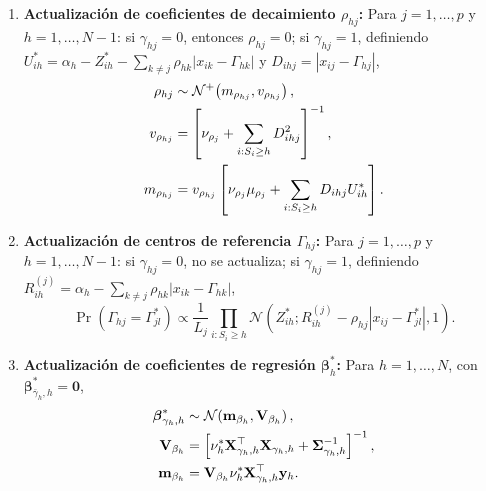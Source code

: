 \begin{enumerate}
    \item \textbf{Actualización de coeficientes de decaimiento $\rho_{hj}$:}
    Para $j = 1, \dots, p$ y $h = 1, \dots, N-1$: si $\gamma_{hj} = 0$,
    entonces $\rho_{hj} = 0$; si $\gamma_{hj} = 1$, definiendo
    $U_{ih}^* = \alpha_h - Z_{ih}^* - \sum_{k \neq j}\rho_{hk}
    |x_{ik} - \Gamma_{hk}|$ y $D_{ihj} = |x_{ij} - \Gamma_{hj}|$,
    \begin{align}
    \rho_{hj} &\sim \mathcal{N}^+\!\left(m_{\rho_{hj}},
    v_{\rho_{hj}}\right), \notag\\
    v_{\rho_{hj}} &= \left[\nu_{\rho_j}
    + \sum_{i:S_i \geq h} D_{ihj}^2\right]^{-1}, \notag\\
    m_{\rho_{hj}} &= v_{\rho_{hj}}\left[\nu_{\rho_j}\mu_{\rho_j}
    + \sum_{i:S_i \geq h} D_{ihj} U_{ih}^*\right].
    \end{align}
 
    \item \textbf{Actualización de centros de referencia $\Gamma_{hj}$:}
    Para $j = 1, \dots, p$ y $h = 1, \dots, N-1$: si $\gamma_{hj} = 0$,
    no se actualiza; si $\gamma_{hj} = 1$, definiendo
    $R_{ih}^{(j)} = \alpha_h - \sum_{k \neq j}\rho_{hk}|x_{ik} - \Gamma_{hk}|$,
    \begin{equation}
        \Pr(\Gamma_{hj} = \Gamma_{jl}^*) \propto
        \frac{1}{L_j} \prod_{i:S_i \geq h}
        \mathcal{N}\!\left(Z_{ih}^*;
        R_{ih}^{(j)} - \rho_{hj}|x_{ij} - \Gamma_{jl}^*|, 1\right).
    \end{equation}
 
    \item \textbf{Actualización de coeficientes de regresión
    $\boldsymbol{\beta}_h^*$:} Para $h = 1, \dots, N$, con
    $\boldsymbol{\beta}_{\bar{\gamma}_h,h}^* = \mathbf{0}$,
    \begin{align}
        \boldsymbol{\beta}_{\gamma_h,h}^* &\sim
        \mathcal{N}\!\left(\mathbf{m}_{\beta_h},
        \mathbf{V}_{\beta_h}\right), \notag\\
        \mathbf{V}_{\beta_h} &= \left[\nu_h^*
        \mathbf{X}_{\gamma_h,h}^\top \mathbf{X}_{\gamma_h,h}
        + \boldsymbol{\Sigma}_{\gamma_h,h}^{-1}\right]^{-1}, \notag\\
        \mathbf{m}_{\beta_h} &= \mathbf{V}_{\beta_h}
        \nu_h^* \mathbf{X}_{\gamma_h,h}^\top \mathbf{y}_h.
    \end{align}
 

\end{enumerate}
